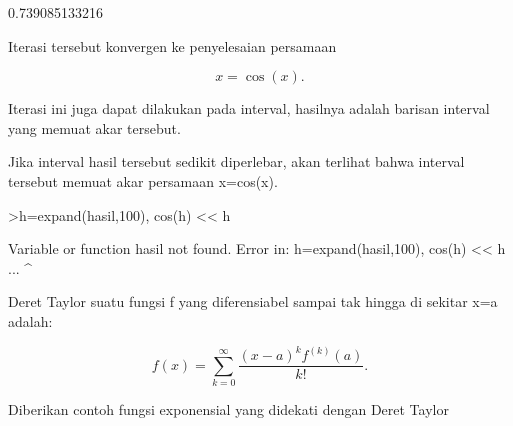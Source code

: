 \documentclass[a4paper,10pt]{article}
\begin{document}
\begin{eulernotebook}
\begin{eulercomment}
\begin{eulercomment}
\begin{eulercomment}
\begin{eulercomment}
\begin{eulercomment}
\begin{eulercomment}
\begin{eulercomment}
\begin{eulercomment}
\begin{eulercomment}
\begin{eulercomment}
\begin{eulercomment}
\begin{eulercomment}
\begin{eulercomment}
\begin{eulercomment}
\begin{eulercomment}
\begin{eulercomment}
\begin{eulercomment}
\begin{eulercomment}
\begin{eulercomment}
\begin{eulercomment}
\begin{eulercomment}
\begin{eulercomment}
\begin{eulercomment}
\begin{eulercomment}
\begin{eulercomment}
\begin{eulercomment}
\begin{eulercomment}
\begin{eulercomment}
\begin{euleroutput}
  0.739085133216
\end{euleroutput}
\begin{eulercomment}
Iterasi tersebut konvergen ke penyelesaian persamaan

\end{eulercomment}
\begin{eulerformula}
\[
x = \cos(x).
\]
\end{eulerformula}
\begin{eulercomment}
Iterasi ini juga dapat dilakukan pada interval, hasilnya adalah
barisan interval yang memuat akar tersebut.

Jika interval hasil tersebut sedikit diperlebar, akan terlihat bahwa
interval tersebut memuat akar persamaan x=cos(x).
\end{eulercomment}
\begin{eulerprompt}
>h=expand(hasil,100), cos(h) << h
\end{eulerprompt}
\begin{euleroutput}
  Variable or function hasil not found.
  Error in:
  h=expand(hasil,100), cos(h) << h ...
                ^
\end{euleroutput}
\begin{eulercomment}
Deret Taylor suatu fungsi f yang diferensiabel sampai tak hingga di
sekitar x=a adalah:

\end{eulercomment}
\begin{eulerformula}
\[
f(x) = \sum_{k=0}^\infty \frac{(x-a)^k f^{(k)}(a)}{k!}.
\]
\end{eulerformula}
\begin{eulercomment}
Diberikan contoh fungsi exponensial yang didekati dengan Deret Taylor


\end{eulercomment}
\end{eulercomment}
\end{eulercomment}
\end{eulercomment}
\end{eulercomment}
\end{eulercomment}
\end{eulercomment}
\end{eulercomment}
\end{eulercomment}
\end{eulercomment}
\end{eulercomment}
\end{eulercomment}
\end{eulercomment}
\end{eulercomment}
\end{eulercomment}
\end{eulercomment}
\end{eulercomment}
\end{eulercomment}
\end{eulercomment}
\end{eulercomment}
\end{eulercomment}
\end{eulercomment}
\end{eulercomment}
\end{eulercomment}
\end{eulercomment}
\end{eulercomment}
\end{eulercomment}
\end{eulercomment}
\end{eulercomment}
\end{eulernotebook}
\end{document}
